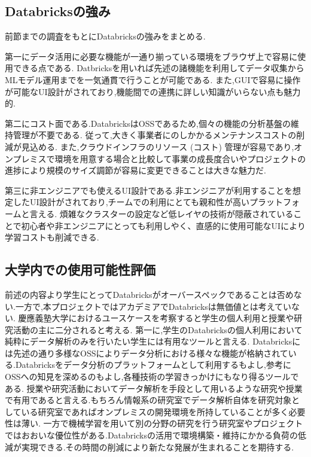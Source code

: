 \documentclass[twocolumn]{jsarticle}
\begin{document}
\subsection{Databricksの強み}
前節までの調査をもとにDatabricksの強みをまとめる.\par
第一にデータ活用に必要な機能が一通り揃っている環境をブラウザ上で容易に使用できる点である.
Datbricksを用いれば先述の諸機能を利用してデータ収集からMLモデル運用までを一気通貫で行うことが可能である.
また,GUIで容易に操作が可能なUI設計がされており,機能間での連携に詳しい知識がいらない点も魅力的.\par
第二にコスト面である.DatabricksはOSSであるため,個々の機能の分析基盤の維持管理が不要である.
従って,大きく事業者にのしかかるメンテナンスコストの削減が見込める.
また,クラウドインフラのリソース (コスト) 管理が容易であり,オンプレミスで環境を用意する場合と比較して事業の成長度合いやプロジェクトの進捗により規模のサイズ調節が容易に変更できることは大きな魅力だ.\par
第三に非エンジニアでも使えるUI設計である.非エンジニアが利用することを想定したUI設計がされており,チームでの利用にとても親和性が高いプラットフォームと言える.
煩雑なクラスターの設定など低レイヤの技術が隠蔽されていることで初心者や非エンジニアにとっても利用しやく、直感的に使用可能なUIにより学習コストも削減できる.
\subsection{大学内での使用可能性評価}
前述の内容より学生にとってDatabricksがオーバースペックであることは否めない.一方で,本プロジェクトではアカデミアでDatabricksは無価値とは考えていない.
慶應義塾大学におけるユースケースを考察すると学生の個人利用と授業や研究活動の主に二分されると考える.
第一に,学生のDatabricksの個人利用において純粋にデータ解析のみを行いたい学生には有用なツールと言える.
Databricksには先述の通り多様なOSSによりデータ分析における様々な機能が格納されている.Databricksをデータ分析のプラットフォームとして利用するもよし,参考にOSSへの知見を深めるのもよし,各種技術の学習きっかけにもなり得るツールである.
授業や研究活動においてデータ解析を手段として用いるような研究や授業で有用であると言える.もちろん情報系の研究室でデータ解析自体を研究対象としている研究室であればオンプレミスの開発環境を所持していることが多く必要性は薄い.
一方で機械学習を用いて別の分野の研究を行う研究室やプロジェクトではおおいな優位性がある.Databricksの活用で環境構築・維持にかかる負荷の低減が実現できる.その時間の削減により新たな発展が生まれることを期待する.
\end{document}
